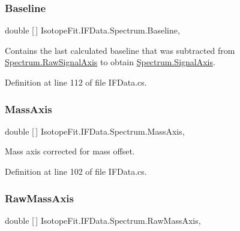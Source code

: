 \subsubsection{\texorpdfstring{Baseline}{Baseline}}
{\footnotesize\ttfamily double \mbox{[}$\,$\mbox{]} Isotope\+Fit.\+I\+F\+Data.\+Spectrum.\+Baseline\hspace{0.3cm}{\ttfamily [get]}, {\ttfamily [set]}}



Contains the last calculated baseline that was subtracted from \hyperlink{class_isotope_fit_1_1_i_f_data_1_1_spectrum_a948927d795db6a73eb1ddeac4f294cac}{Spectrum.\+Raw\+Signal\+Axis} to obtain \hyperlink{class_isotope_fit_1_1_i_f_data_1_1_spectrum_a561e2e683aee78aed97a967a68b474e9}{Spectrum.\+Signal\+Axis}. 



Definition at line 112 of file I\+F\+Data.\+cs.

\mbox{\label{class_isotope_fit_1_1_i_f_data_1_1_spectrum_a4ed9378cb593bfffacaa3ac4411c039d}} 
\subsubsection{\texorpdfstring{Mass\+Axis}{MassAxis}}
{\footnotesize\ttfamily double \mbox{[}$\,$\mbox{]} Isotope\+Fit.\+I\+F\+Data.\+Spectrum.\+Mass\+Axis\hspace{0.3cm}{\ttfamily [get]}, {\ttfamily [set]}}



Mass axis corrected for mass offset. 



Definition at line 102 of file I\+F\+Data.\+cs.

\mbox{\label{class_isotope_fit_1_1_i_f_data_1_1_spectrum_ac3297615e23a978626e4beaf9e040e2a}} 
\subsubsection{\texorpdfstring{Raw\+Mass\+Axis}{RawMassAxis}}
{\footnotesize\ttfamily double \mbox{[}$\,$\mbox{]} Isotope\+Fit.\+I\+F\+Data.\+Spectrum.\+Raw\+Mass\+Axis\hspace{0.3cm}{\ttfamily [get]}, {\ttfamily [set]}}



